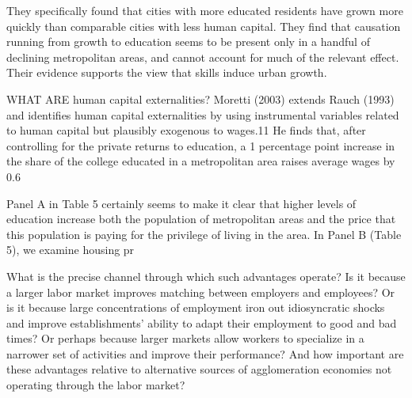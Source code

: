 \documentclass[a4paper]{article}
\theoremstyle{definition}
\theoremstyle{plain}
\begin{document}
{They specifically found that cities with more educated residents have grown more quickly than comparable cities with less human capital. They find that causation running from growth to education seems to be present only in a handful of declining metropolitan areas, and cannot account for much of the relevant effect. Their evidence supports the view that skills induce urban growth.



WHAT ARE human capital externalities?
Moretti (2003) extends Rauch (1993) and identifies human capital externalities by using instrumental variables related to human capital but plausibly exogenous to wages.11 He finds that, after controlling for the private returns to education, a 1 percentage point increase in the share of the college educated in a metropolitan area raises average wages by 0.6%


Panel A in Table 5 certainly seems to make it clear that higher levels of education increase both the population of metropolitan areas and the price that this population is paying for the privilege of living in the area. In Panel B (Table 5), we examine housing pr

What is the precise channel through which such advantages operate? Is it because a larger labor market improves matching between employers and employees? Or is it because large concentrations of employment iron out idiosyncratic shocks and improve establishments' ability to adapt their employment to good and bad times? Or perhaps because larger markets allow workers to specialize in a narrower set of activities and improve their performance? And how important are these advantages relative to alternative sources of agglomeration economies not operating through the labor market? %

}
\end{document}
